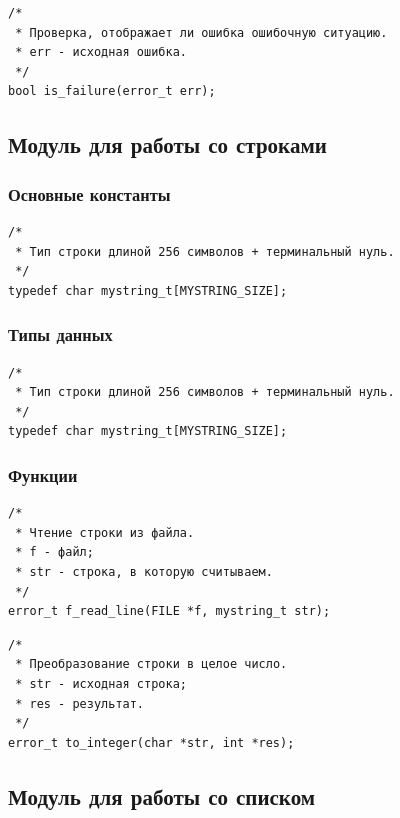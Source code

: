 \documentclass[a4paper,12pt]{extarticle}
\begin{document}
 \vspace{0.5cm}

\begin{verbatim}
/*
 * Проверка, отображает ли ошибка ошибочную ситуацию.
 * err - исходная ошибка.
 */
bool is_failure(error_t err);
\end{verbatim}


 \vspace{0.5cm}


\subsection{Модуль для работы со строками}
\subsubsection{Основные константы}
\begin{verbatim}
/*
 * Тип строки длиной 256 символов + терминальный нуль.
 */
typedef char mystring_t[MYSTRING_SIZE];
\end{verbatim}




\subsubsection{Типы данных}
\begin{verbatim}
/*
 * Тип строки длиной 256 символов + терминальный нуль.
 */
typedef char mystring_t[MYSTRING_SIZE];
\end{verbatim}




\subsubsection{Функции}
\begin{verbatim}
/*
 * Чтение строки из файла.
 * f - файл;
 * str - строка, в которую считываем.
 */
error_t f_read_line(FILE *f, mystring_t str);
\end{verbatim}


 \vspace{0.5cm}

\begin{verbatim}
/*
 * Преобразование строки в целое число.
 * str - исходная строка;
 * res - результат.
 */
error_t to_integer(char *str, int *res);
\end{verbatim}


 \vspace{0.5cm}

\subsection{Модуль для работы со списком}
\end{document}
